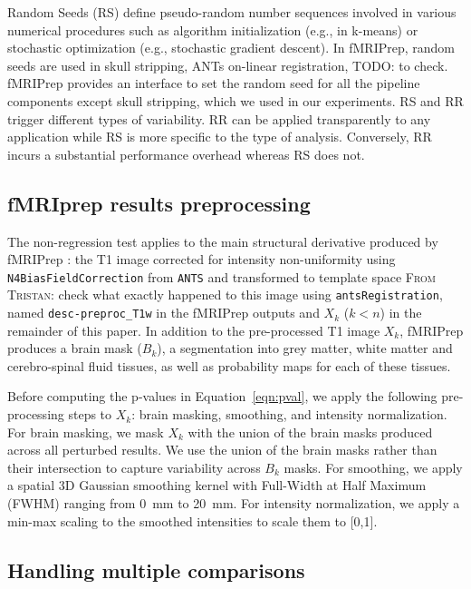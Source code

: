 \documentclass{article}
\newcommand{\TODO}[1]{\color{red}\textsc{TODO:} #1\color{black}\xspace}
\newcommand{\TG}[1]{\color{blue}\textsc{From Tristan:} #1\color{black}\xspace}
\newcommand{\fmriprep}{fMRIPrep \xspace}
\newcommand{\fwhm}{\textsc{FWHM}}
\begin{document}
Random Seeds (RS) define pseudo-random number sequences involved in various
numerical procedures such as algorithm initialization (e.g., in k-means) or
stochastic optimization (e.g., stochastic gradient descent). In fMRIPrep, random
seeds are used in skull stripping, ANTs on-linear registration, \TODO{to check}.
fMRIPrep provides an interface to set the random seed for all the pipeline
components except skull stripping, which we used in our experiments. RS and RR
trigger different types of variability. RR can be applied transparently to any
application while RS is more specific to the type of analysis. Conversely, RR
incurs a substantial performance overhead whereas RS does not.

\subsection{fMRIprep results preprocessing}

The non-regression test applies to the main structural derivative produced by
\fmriprep: the T1 image corrected for intensity non-uniformity using
\texttt{N4BiasFieldCorrection} from \texttt{ANTS} and transformed to template
space \TG{check what exactly happened to this image} using
\texttt{antsRegistration}, named \texttt{desc-preproc\_T1w} in the \fmriprep
outputs and $X_k$ ($k < n$) in the remainder of this paper. In addition to the
pre-processed T1 image $X_k$, \fmriprep produces a brain mask ($B_k$), a
segmentation into grey matter, white matter and cerebro-spinal fluid tissues, as
well as probability maps for each of these tissues.

Before computing the p-values in Equation~\ref{eqn:pval}, we apply the following
pre-processing steps to $X_k$: brain masking, smoothing, and intensity
normalization. For brain masking, we mask $X_k$ with the union of the brain
masks produced across all perturbed results. We use the union of the brain masks
rather than their intersection to capture variability across $B_k$ masks. For
smoothing, we apply a spatial 3D Gaussian smoothing kernel with Full-Width at Half
Maximum (\fwhm) ranging from 0~mm to 20~mm. For intensity normalization, we apply
a min-max scaling to the smoothed intensities to scale them to [0,1].

\subsection{Handling multiple comparisons}
\end{document}
